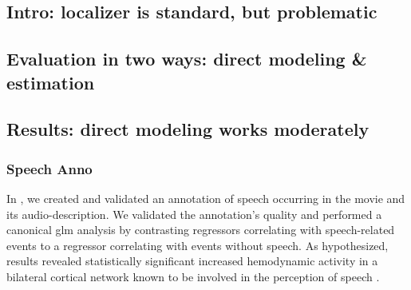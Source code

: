 


\subsection{Intro: localizer is standard, but problematic}






\subsection{Evaluation in two ways: direct modeling \& estimation}






\subsection{Results: direct modeling works moderately}




\subsubsection{Speech Anno}


In \citep{haeusler2021speechanno}, we created and validated an annotation of
speech occurring in the movie and its audio-description.
We validated the annotation's quality \citep{haeusler2021speechanno} and
performed a canonical \ac{glm} analysis by contrasting regressors correlating
with speech-related events to a regressor correlating with events without
speech.
As hypothesized, results revealed statistically significant increased
hemodynamic activity in a bilateral cortical network known to be involved in the
perception of speech \citep[e.g.,][]{friederici2011brain, wilson2008beyond}.

